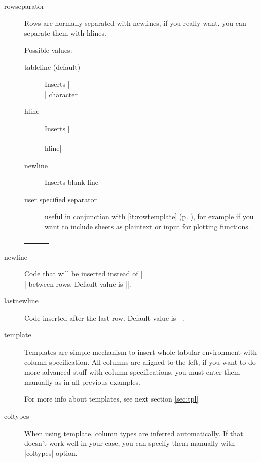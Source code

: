 \documentclass{ltxdoc}
\begin{document}
\begin{description}
\item[rowseparator] Rows are normally separated with newlines, if you really want, you can separate them with hlines. 

Possible values:
\begin{description}
\item[tableline (default)] Inserts |\\| character
\item[hline] Inserts |\\ \\hline| 
\item[newline] Inserts blank line
\item[user specified separator] useful in conjunction with \ref{it:rowtemplate} 
(p. \pageref{it:rowtemplate}), for example if you want to include sheets 
as plaintext or input for plotting functions.  
\end{description} 
\begin{LTXexample}
\begin{tabular}{lll}
\end{tabular}     
\end{LTXexample} 

\item[newline] Code that will be inserted instead of |\\| between rows. Default value is |\OdsNl|.
\item[lastnewline] Code inserted after the last row. Default value is |\OdsLastNl|.

\item[template] Templates are simple mechanism to insert whole tabular environment with column specification. All columns are aligned to the left, if you want to do more advanced stuff with column specifications, you must enter them manually as in all previous examples.
\begin{LTXexample}
\end{LTXexample}
For more info about templates, see next section \ref{sec:tpl}

\item[coltypes] When using template, column types are inferred automatically. If that doesn't work well in your case, you can specify them manually with |coltypes| option.

  \begin{LTXexample}
  \end{LTXexample}


\end{description}
\end{document}
